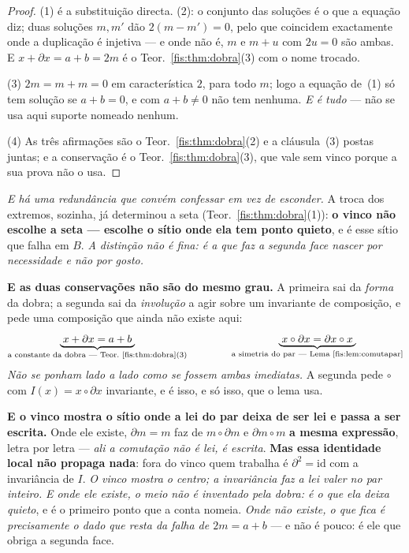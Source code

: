 \documentclass[livro.tex]{subfiles}
\begin{document}
\begin{proof}
(1) é a substituição directa. (2): o conjunto das soluções é o que a equação diz;
duas soluções $m,m'$ dão $2(m-m')=0$, pelo que coincidem exactamente onde a
duplicação é injetiva --- e onde não é, $m$ e $m+u$ com $2u=0$ são ambas. E
$x+\partial x=a+b=2m$ é o Teor.~\ref{fis:thm:dobra}(3) com o nome trocado.

(3) $2m=m+m=0$ em característica $2$, para todo $m$; logo a equação de~(1) só tem
solução se $a+b=0$, e com $a+b\neq0$ não tem nenhuma. \emph{E é tudo} --- não se
usa aqui suporte nomeado nenhum.

(4) As três afirmações são o Teor.~\ref{fis:thm:dobra}(2) e a cláusula~(3) postas
juntas; e a conservação é o Teor.~\ref{fis:thm:dobra}(3), que vale sem vinco
porque a sua prova não o usa.
\end{proof}

\medskip\noindent\emph{E há uma redundância que convém confessar em vez de
esconder.} A troca dos extremos, sozinha, já determinou a seta
(Teor.~\ref{fis:thm:dobra}(1)): \textbf{o vinco não escolhe a seta --- escolhe o
sítio onde ela tem ponto quieto}, e é esse sítio que falha em $B$. \emph{A
distinção não é fina: é a que faz a segunda face nascer por necessidade e não por
gosto.}

\medskip\noindent\textbf{E as duas conservações não são do mesmo grau.} A
primeira sai da \emph{forma} da dobra; a segunda sai da \emph{involução} a agir
sobre um invariante de composição, e pede uma composição que ainda não existe
aqui:
\[
\underbrace{\;x+\partial x=a+b\;}_{\text{a constante da dobra --- Teor.~\ref{fis:thm:dobra}(3)}}
\qquad\qquad
\underbrace{\;x\circ\partial x=\partial x\circ x\;}_{\text{a simetria do par --- Lema~\ref{fis:lem:comutapar}}}
\]
\emph{Não se ponham lado a lado como se fossem ambas imediatas.} A segunda pede
$\circ$ com $I(x)=x\circ\partial x$ invariante, e é isso, e só isso, que o lema
usa.

\medskip\noindent\textbf{E o vinco mostra o sítio onde a lei do par deixa de ser
lei e passa a ser escrita.} Onde ele existe, $\partial m=m$ faz de
$m\circ\partial m$ e $\partial m\circ m$ \textbf{a mesma expressão}, letra por
letra --- \emph{ali a comutação não é lei, é escrita}. \textbf{Mas essa
identidade local não propaga nada}: fora do vinco quem trabalha é
$\partial^{2}=\mathrm{id}$ com a invariância de $I$. \emph{O vinco mostra o
centro; a invariância faz a lei valer no par inteiro.} \emph{E onde ele existe, o
meio não é inventado pela dobra: é o que ela deixa quieto}, e é o primeiro ponto
que a conta nomeia. \emph{Onde não existe, o que fica é precisamente o dado que
resta da falha de $2m=a+b$} --- e não é pouco: é ele que obriga a segunda face.
\end{document}
